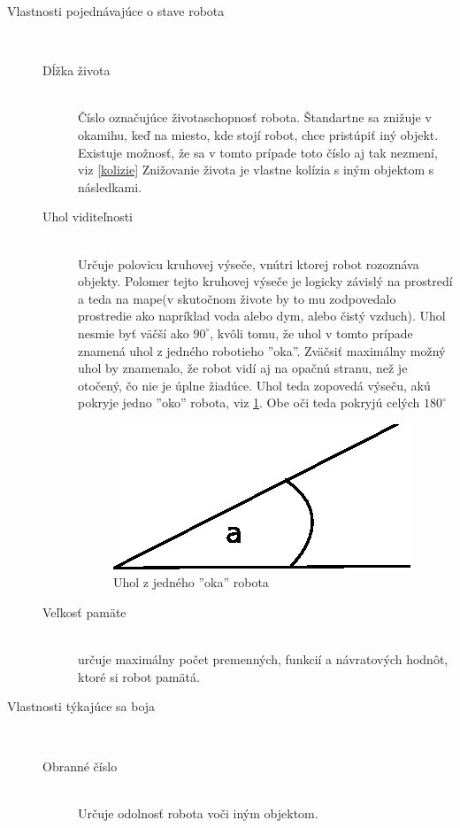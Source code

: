 \begin{description}
\item [Vlastnosti pojednávajúce o stave robota] \hfill \\
\begin{description} 
\item [Dĺžka života] \hfill \\ Číslo označujúce životaschopnosť robota. Štandartne sa znižuje v okamihu, keď na miesto, kde stojí robot, chce pristúpiť iný objekt. Existuje možnosť, že sa v tomto prípade toto číslo aj tak nezmení, viz \ref{kolizie} Znižovanie života je vlastne kolízia s iným objektom s následkami.
\item [Uhol viditeľnosti]\hfill \\ Určuje polovicu kruhovej výseče, vnútri ktorej robot rozoznáva objekty. Polomer tejto kruhovej výseče je logicky závislý na prostredí a teda na mape(v skutočnom živote by to mu zodpovedalo prostredie ako napríklad voda alebo dym, alebo čistý vzduch). Uhol nesmie byť väčší ako $90^\circ$, kvôli tomu, že uhol v tomto prípade znamená uhol z jedného robotieho ''oka''. Zväčsiť maximálny možný uhol by znamenalo, že robot vidí aj na opačnú stranu, než je otočený, čo nie je úplne žiadúce. Uhol teda zopovedá výseču, akú pokryje jedno ''oko'' robota, viz \ref{fig:uhol}. Obe oči teda pokryjú celých $180^\circ$
\begin {figure}
\centering
\includegraphics{angle}
\caption { Uhol z jedného ''oka'' robota }
\label{fig:uhol}
\end {figure}
\item [Veľkosť pamäte]\hfill \\ určuje maximálny počet premenných, funkcií a návratových hodnôt, ktoré si robot pamätá. 
\end{description}
\item [Vlastnosti týkajúce sa boja]\hfill \\
\begin{description}
\item [Obranné číslo]\hfill \\ Určuje odolnosť robota voči iným objektom.

\end{description}
\end{description}
